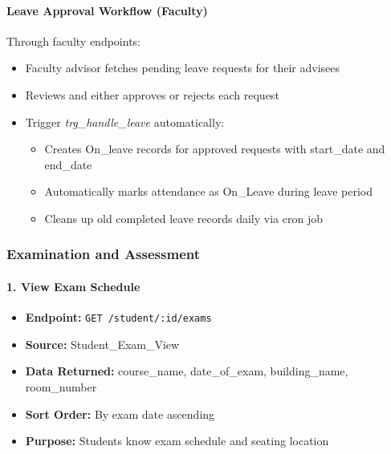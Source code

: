 \documentclass[12pt]{article}
\begin{document}
\paragraph{Leave Approval Workflow (Faculty)}\vspace{5pt}

Through faculty endpoints:
\begin{itemize}
    \item Faculty advisor fetches pending leave requests for their advisees
    \item Reviews and either approves or rejects each request
    \item Trigger \textit{trg\_handle\_leave} automatically:
        \begin{itemize}
            \item Creates On\_leave records for approved requests with start\_date and end\_date
            \item Automatically marks attendance as On\_Leave during leave period
            \item Cleans up old completed leave records daily via cron job
        \end{itemize}
\end{itemize}

\subsubsection{Examination and Assessment}

\paragraph{1. View Exam Schedule}
\begin{itemize}
    \item \textbf{Endpoint:} \texttt{GET /student/:id/exams}
    \item \textbf{Source:} Student\_Exam\_View
    \item \textbf{Data Returned:} course\_name, date\_of\_exam, building\_name, room\_number
    \item \textbf{Sort Order:} By exam date ascending
    \item \textbf{Purpose:} Students know exam schedule and seating location
\end{itemize}
\end{document}
